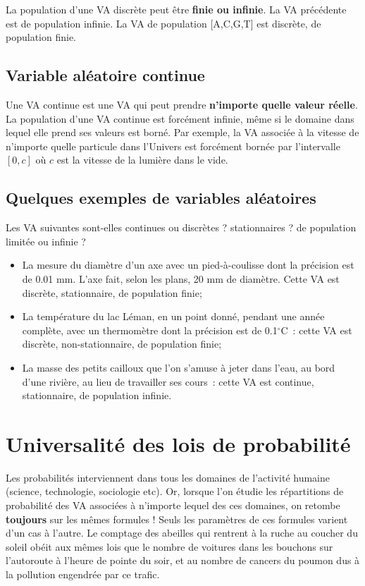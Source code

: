 La population d'une VA discrète peut être \textbf{finie ou infinie}. La VA précédente est de population infinie. La VA de population [A,C,G,T] est discrète, de population finie.

\subsection{Variable aléatoire continue}

Une VA continue est une VA qui peut prendre \textbf{n'importe quelle valeur réelle}. La population d'une VA continue est forcément infinie, même si le domaine dans lequel elle prend ses valeurs est borné. Par exemple, la VA associée à la vitesse de n'importe quelle particule dans l'Univers est forcément bornée par l'intervalle $[0,c]$ où $c$ est la vitesse de la lumière dans le vide.

\subsection*{Quelques exemples de variables aléatoires}

Les VA suivantes sont-elles continues ou discrètes ? stationnaires ? de population limitée ou infinie ?
\begin{itemize}\itemsep1pt
\renewcommand{\labelitemi}{$\bullet$}
\item La mesure du diamètre d'un axe avec un pied-à-coulisse dont la précision est de 0.01 mm. L'axe fait, selon les plans, 20 mm de diamètre. Cette VA est discrète, stationnaire, de population finie;
\item La température du lac Léman, en un point donné, pendant une année complète, avec un thermomètre dont la précision est de 0.1$^\circ$C~: cette VA est discrète, non-stationnaire, de population finie;
\item La masse des petits cailloux que l'on s'amuse à jeter dans l'eau, au bord d'une rivière, au lieu de travailler ses cours~: cette VA est continue, stationnaire, de population infinie.
\end{itemize}

\section{Universalité des lois de probabilité}

Les probabilités interviennent dans tous les domaines de l'activité humaine (science, technologie, sociologie etc). Or, lorsque l'on étudie les répartitions de probabilité des VA associées à n'importe lequel des ces domaines, on retombe \textbf{toujours} sur les mêmes formules ! Seuls les paramètres de ces formules varient d'un cas à l'autre. Le comptage des abeilles qui rentrent à la ruche au coucher du soleil obéit aux mêmes lois que le nombre de voitures dans les bouchons sur l'autoroute à l'heure de pointe du soir, et au nombre de cancers du poumon dus à la pollution engendrée par ce trafic.

